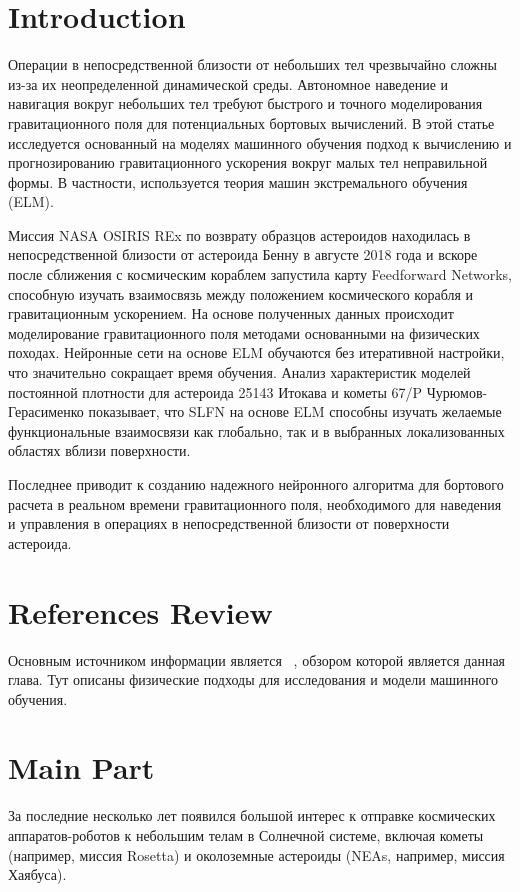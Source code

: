 \section{Introduction}

Операции в непосредственной близости от небольших тел чрезвычайно сложны из-за их неопределенной динамической среды. 
Автономное наведение и навигация вокруг небольших тел требуют быстрого и точного моделирования гравитационного поля для потенциальных бортовых вычислений.
В этой статье исследуется основанный на моделях машинного обучения подход к вычислению и прогнозированию гравитационного ускорения вокруг малых тел неправильной формы.
В частности, используется теория машин экстремального обучения (ELM).

Миссия NASA OSIRIS REx по возврату образцов астероидов находилась в непосредственной близости от астероида Бенну в августе 2018 года и вскоре после сближения с космическим кораблем запустила карту Feedforward Networks, способную изучать взаимосвязь между положением космического корабля и гравитационным ускорением.
На основе полученных данных происходит моделирование гравитационного поля методами основанными на физических походах.
Нейронные сети на основе ELM обучаются без итеративной настройки, что значительно сокращает время обучения.
Анализ характеристик моделей постоянной плотности для астероида 25143 Итокава и кометы 67/P Чурюмов-Герасименко показывает, что SLFN на основе ELM способны изучать желаемые функциональные взаимосвязи как глобально, так и в выбранных локализованных областях вблизи поверхности.

Последнее приводит к созданию надежного нейронного алгоритма для бортового расчета в реальном времени гравитационного поля, необходимого для наведения и управления в операциях в непосредственной близости от поверхности астероида.

\section{References Review}

Основным источником информации является ~\cite{FURFARO2021617}, обзором которой является данная глава. Тут описаны физические подходы для исследования и модели машинного обучения.


\section{Main Part}

За последние несколько лет появился большой интерес к отправке космических аппаратов-роботов к небольшим телам в Солнечной системе, включая кометы (например, миссия Rosetta) и околоземные астероиды (NEAs, например, миссия Хаябуса).

